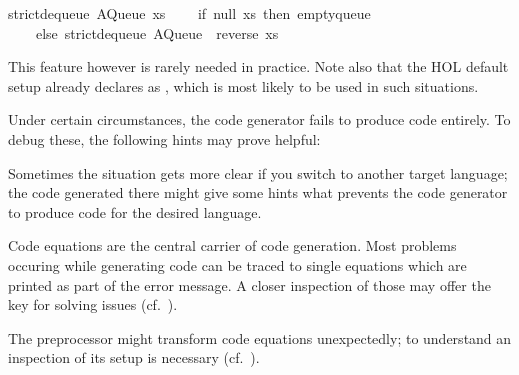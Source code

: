\begin{isabellebody}
\begin{isamarkuptext}
strict{}dequeue\ {}AQueue\ xs\ {}{}{}\ {}\isanewline
\ \ {}if\ null\ xs\ then\ empty{}queue\isanewline
\ \ \ \ else\ strict{}dequeue\ {}AQueue\ {}{}\ {}reverse\ xs{}{}{}{}\isanewline%
\end{isamarkuptext}%
\isamarkuptrue%
%
\endisatagquotetypewriter
{\isafoldquotetypewriter}%
%
\isadelimquotetypewriter
%
\endisadelimquotetypewriter
%
\begin{isamarkuptext}%
\noindent This feature however is rarely needed in practice.  Note
  also that the HOL default setup already declares 
  as \hyperlink{command.code-abort}{\mbox{}}, which is most likely to be used in such
  situations.%
\end{isamarkuptext}%
\isamarkuptrue%
%
\isamarkuptrue%
%
\begin{isamarkuptext}%
Under certain circumstances, the code generator fails to produce
  code entirely.  To debug these, the following hints may prove
  helpful:

  \begin{description}

      Sometimes
      the situation gets more clear if you switch to another target
      language; the code generated there might give some hints what
      prevents the code generator to produce code for the desired
      language.

      Code equations are the central
      carrier of code generation.  Most problems occuring while generating
      code can be traced to single equations which are printed as part of
      the error message.  A closer inspection of those may offer the key
      for solving issues (cf.~).

      The preprocessor might
      transform code equations unexpectedly; to understand an
      inspection of its setup is necessary (cf.~).


\end{description}
\end{isamarkuptext}
\end{isabellebody}
